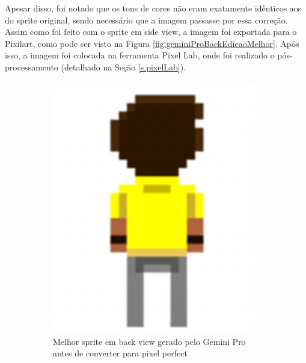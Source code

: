 Apesar disso, foi notado que os tons de cores não eram exatamente idênticos aos do sprite original, sendo necessário que a imagem passasse por essa correção. Assim como foi feito com o sprite em side view, a imagem foi exportada para o Pixilart, como pode ser visto na Figura \ref{fig:geminiProBackEdicaoMelhor}. Após isso, a imagem foi colocada na ferramenta Pixel Lab, onde foi realizado o pós-processamento (detalhado na Seção \ref{s.pixelLab}).

\begin{figure}[htbp]
    \centering
    \caption{\small Processo de edição do melhor sprite em back view no Pixirart}
    \label{fig:geminiProBackEdicaoMelhor}
    \begin{subfigure}{0.45\linewidth}
        \includegraphics[width=1\linewidth]{figs/geminiPro/chat12/02_res2.png}
        \caption{\small Melhor sprite em back view gerado pelo Gemini Pro antes de converter para pixel perfect}
        \label{fig:geminiProBackEdicaoMelhorAntesEdicao}
    \end{subfigure}\hfill
    \begin{subfigure}{0.45\linewidth}

\end{subfigure}
\end{figure}

